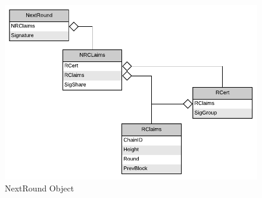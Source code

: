 \begin{figure}[H]
    \centering
    \includegraphics[scale=0.5]{figures/NextRound_Object.pdf}
    \caption{NextRound Object}
\end{figure}
